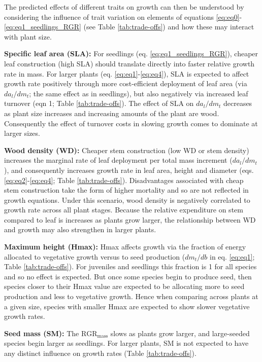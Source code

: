 \documentclass[a4paper]{article}\usepackage[]{graphicx}\usepackage[]{color}
\begin{document}
\begin{appendices}
The predicted effects of different traits on growth can then be understood by considering the influence of trait variation on elements of equations  \ref{eq:eq0}-\ref{eq:eq1_seedlings_RGR} (see Table \ref{tab:trade-offs}) and how these may interact with plant size.


\textbf{Specific leaf area (SLA):} For seedlings (eq. \ref{eq:eq1_seedlings_RGR}), cheaper leaf construction (high SLA) should translate directly into faster relative growth rate in mass. For larger plants (eq. \ref{eq:eq1}-\ref{eq:eq4}), SLA is expected to affect growth rate positively through more cost-efficient deployment of leaf area (via $da_l/dm_t$; the same effect as in seedlings), but also negatively via increased leaf turnover (eqn 1; Table \ref{tab:trade-offs}). The effect of SLA on $da_l/dm_t$ decreases as plant size increases and increasing amounts of the plant are wood. Consequently the effect of turnover costs in slowing growth comes to dominate at larger sizes.

\textbf{Wood density (WD):} Cheaper stem construction (low WD or stem density) increases the marginal rate of leaf deployment per total mass increment ($da_l/dm_t$), and consequently increases growth rate in leaf area, height and diameter (eqs. \ref{eq:eq2}-\ref{eq:eq4}; Table \ref{tab:trade-offs}). Disadvantages associated with cheap stem construction take the form of higher mortality and so are not reflected in growth equations. Under this scenario, wood density is negatively correlated to growth rate across all plant stages. Because the relative expenditure on stem compared to leaf is increases as plants grow larger, the relationship between WD and growth may also strengthen in larger plants.

\textbf{Maximum height (Hmax):} Hmax affects growth via the fraction of energy allocated to vegetative growth versus to seed production ($dm_t/db$ in eq. \ref{eq:eq1}; Table \ref{tab:trade-offs}). For juveniles and seedlings this fraction is 1 for all species and so no effect is expected. But once some species begin to produce seed, then species closer to their Hmax value are expected to be allocating more to seed production and less to vegetative growth. Hence when comparing across plants at a given size, species with smaller Hmax are expected to show slower vegetative growth rates.

\textbf{Seed mass (SM):} The $\textrm{RGR}_{\textrm{mass}}$ slows as plants grow larger, and large-seeded species begin larger as seedlings. For larger plants, SM is not expected to have any distinct influence on growth rates  (Table \ref{tab:trade-offs}).


\end{appendices}
\end{document}
